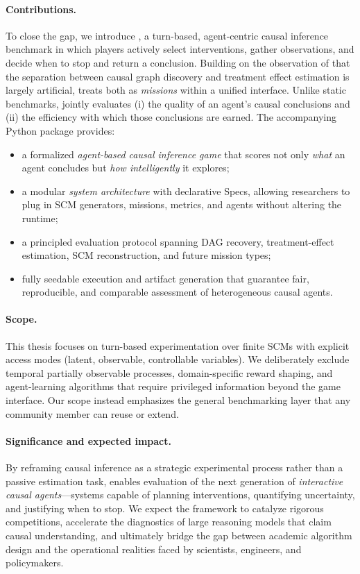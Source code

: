 \paragraph{Contributions.}
To close the gap, we introduce \game, a turn-based, agent-centric causal inference benchmark in which players actively select interventions, gather observations, and decide when to stop and return a conclusion. Building on the observation of \citet{BayesianCausalDiscovery2023} that the separation between causal graph discovery and treatment effect estimation is largely artificial, \game treats both as \emph{missions} within a unified interface. Unlike static benchmarks, \game jointly evaluates (i) the quality of an agent’s causal conclusions and (ii) the efficiency with which those conclusions are earned. The accompanying Python package \package provides:
\begin{itemize}
    \item a formalized \emph{agent-based causal inference game} that scores not only \emph{what} an agent concludes but \emph{how intelligently} it explores;
    \item a modular \emph{system architecture} with declarative Specs, allowing researchers to plug in SCM generators, missions, metrics, and agents without altering the runtime;
    \item a principled evaluation protocol spanning DAG recovery, treatment-effect estimation, SCM reconstruction, and future mission types;
    \item fully seedable execution and artifact generation that guarantee fair, reproducible, and comparable assessment of heterogeneous causal agents.
\end{itemize}

\paragraph{Scope.}
This thesis focuses on turn-based experimentation over finite SCMs with explicit access modes (latent, observable, controllable variables). We deliberately exclude temporal partially observable processes, domain-specific reward shaping, and agent-learning algorithms that require privileged information beyond the game interface. Our scope instead emphasizes the general benchmarking layer that any community member can reuse or extend.

\paragraph{Significance and expected impact.}
By reframing causal inference as a strategic experimental process rather than a passive estimation task, \game enables evaluation of the next generation of \emph{interactive causal agents}—systems capable of planning interventions, quantifying uncertainty, and justifying when to stop. We expect the framework to catalyze rigorous competitions, accelerate the diagnostics of large reasoning models that claim causal understanding, and ultimately bridge the gap between academic algorithm design and the operational realities faced by scientists, engineers, and policymakers.

